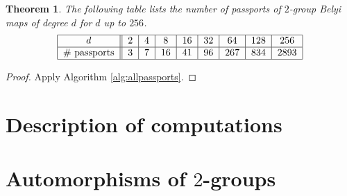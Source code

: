 \documentclass{dcthesis}
\newcommand{\mm}[1]{{\color{blue} \sf MM: [#1]}}
\newtheorem{theorem}[prop]{Theorem}
\newtheorem{lemma}[prop]{Lemma}
\theoremstyle{definition}
\newtheorem{definition}[prop]{Definition}
\theoremstyle{remark}
\numberwithin{equation}{section}
\numberwithin{figure}{section}
\begin{document}
{{\begin{theorem}
      The following table lists the number of passports of
      $2$-group Belyi maps of degree $d$ for $d$ up to $256$.
      \[
        \begin{tabular}{|c||c|c|c|c|c|c|c|c|}
          \hline
          $d$ & $2$ & $4$ & $8$ & $16$ & $32$ & $64$ & $128$ & $256$\\
          \hline
          \# passports & $3$ & $7$ & $16$ & $41$ & $96$ & $267$ & $834$ & $2893$\\
          \hline
        \end{tabular}
      \]
    \end{theorem}
    \begin{proof}
      Apply Algorithm \ref{alg:allpassports}.
    \end{proof}
  }
  \section{Description of computations}{\label{sec:grouptheorycomputations}
  }
  \section{Automorphisms of $2$-groups}{\label{sec:automorphismsoftwogroups}
  }
}
\end{document}
